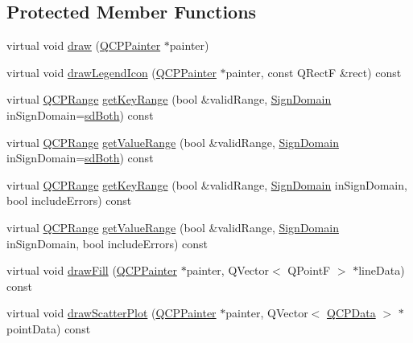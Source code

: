 \subsection*{Protected Member Functions}
\begin{DoxyCompactItemize}
\item 
virtual void \hyperlink{class_q_c_p_graph_a659218cc62c2a7786213d9dd429c1c8d}{draw} (\hyperlink{class_q_c_p_painter}{Q\-C\-P\-Painter} $\ast$painter)
\item 
virtual void \hyperlink{class_q_c_p_graph_a32115df0e940cf8ca7b687873c2d02ee}{draw\-Legend\-Icon} (\hyperlink{class_q_c_p_painter}{Q\-C\-P\-Painter} $\ast$painter, const Q\-Rect\-F \&rect) const 
\item 
virtual \hyperlink{class_q_c_p_range}{Q\-C\-P\-Range} \hyperlink{class_q_c_p_graph_ab39c7e8c94b64804a8dc9c19bc7d4683}{get\-Key\-Range} (bool \&valid\-Range, \hyperlink{class_q_c_p_abstract_plottable_a661743478a1d3c09d28ec2711d7653d8}{Sign\-Domain} in\-Sign\-Domain=\hyperlink{class_q_c_p_abstract_plottable_a661743478a1d3c09d28ec2711d7653d8a082b98cfb91a7363a3b5cd17b0c1cd60}{sd\-Both}) const 
\item 
virtual \hyperlink{class_q_c_p_range}{Q\-C\-P\-Range} \hyperlink{class_q_c_p_graph_a9fc0c1288455fa5bb64b603d6b01de6c}{get\-Value\-Range} (bool \&valid\-Range, \hyperlink{class_q_c_p_abstract_plottable_a661743478a1d3c09d28ec2711d7653d8}{Sign\-Domain} in\-Sign\-Domain=\hyperlink{class_q_c_p_abstract_plottable_a661743478a1d3c09d28ec2711d7653d8a082b98cfb91a7363a3b5cd17b0c1cd60}{sd\-Both}) const 
\item 
virtual \hyperlink{class_q_c_p_range}{Q\-C\-P\-Range} \hyperlink{class_q_c_p_graph_a3a69fbbaea30050a9cfe335a9a01cbf2}{get\-Key\-Range} (bool \&valid\-Range, \hyperlink{class_q_c_p_abstract_plottable_a661743478a1d3c09d28ec2711d7653d8}{Sign\-Domain} in\-Sign\-Domain, bool include\-Errors) const 
\item 
virtual \hyperlink{class_q_c_p_range}{Q\-C\-P\-Range} \hyperlink{class_q_c_p_graph_acdb1e7bb86fea2764b0adb104185832b}{get\-Value\-Range} (bool \&valid\-Range, \hyperlink{class_q_c_p_abstract_plottable_a661743478a1d3c09d28ec2711d7653d8}{Sign\-Domain} in\-Sign\-Domain, bool include\-Errors) const 
\item 
virtual void \hyperlink{class_q_c_p_graph_ad6d07926e6d6b7cfa70258780d47b7a0}{draw\-Fill} (\hyperlink{class_q_c_p_painter}{Q\-C\-P\-Painter} $\ast$painter, Q\-Vector$<$ Q\-Point\-F $>$ $\ast$line\-Data) const 
\item 
virtual void \hyperlink{class_q_c_p_graph_af1872a60bed7acb3f3b17bfae3f4764c}{draw\-Scatter\-Plot} (\hyperlink{class_q_c_p_painter}{Q\-C\-P\-Painter} $\ast$painter, Q\-Vector$<$ \hyperlink{class_q_c_p_data}{Q\-C\-P\-Data} $>$ $\ast$point\-Data) const 

\end{DoxyCompactItemize}
